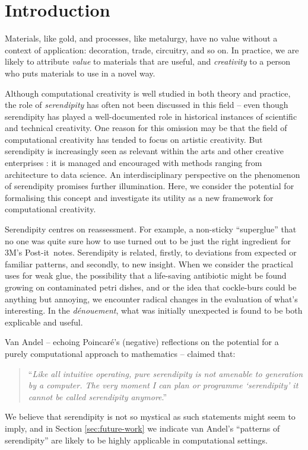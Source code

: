 \section{Introduction}

Materials, like gold, and processes, like metalurgy, have no value
without a context of application: decoration, trade, circuitry, and so
on.  In practice, we are likely to attribute \emph{value} to materials
that are useful, and \emph{creativity} to a person who puts materials
to use in a novel way.

Although computational creativity is well studied in both theory and
practice, the role of \emph{serendipity} has often not been discussed
in this field -- even though serendipity has played a well-documented
role in historical instances of scientific and technical creativity.
One reason for this omission may be that the field of computational
creativity has tended to focus on artistic creativity.  But
serendipity is increasingly seen as relevant within the arts
\cite{mckay-serendipity} and other creative enterprises
\cite{kakko2009homo,engineering-serendipity}: it is managed and
encouraged with methods ranging from architecture to data science.
%
An interdisciplinary perspective on the phenomenon of serendipity
promises further illumination.  Here, we consider the potential for
formalising this concept and investigate its utility as a new
framework for computational creativity.

Serendipity centres on reassessment.  For example, a non-sticky
``superglue'' that no one was quite sure how to use turned out to be
just the right ingredient for 3M's Post-it\texttrademark\ notes.
%
Serendipity is related, firstly, to deviations from expected or
familiar patterns, and secondly, to new insight.
%
When we consider the practical uses for weak glue, the possibility
that a life-saving antibiotic might be found growing on contaminated
petri dishes, and or the idea that cockle-burs could be anything but
annoying, we encounter radical changes in the evaluation of what's
interesting.  In the \emph{d\'enouement}, what was initially
unexpected is found to be both explicable and useful.

Van Andel \citeyear{van1994anatomy} -- echoing Poincar\'e's
\citeyear{poincare1910creation} (negative) reflections on the potential
for a purely computational approach to mathematics -- claimed that:
\begin{quote}
``\emph{Like all intuitive operating, pure serendipity is not amenable
    to generation by a computer.  The very moment I can plan or
    programme `serendipity' it cannot be called serendipity
    anymore}.'' \cite{van1994anatomy}
\end{quote}
We believe that serendipity is not so mystical as such statements
might seem to imply, and in Section \ref{sec:future-work} we indicate
van Andel's ``patterns of serendipity'' are likely to be highly
applicable in computational settings.

